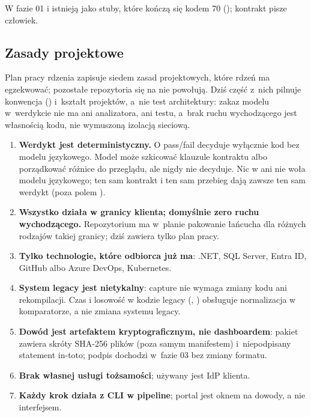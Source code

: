 W fazie 01  i  istnieją jako stuby, które kończą
się kodem 70 (); kontrakt pisze człowiek.


\subsection{Zasady projektowe}\label{sec:architektura-zasady}

Plan pracy rdzenia zapisuje siedem zasad projektowych, które rdzeń ma egzekwować;
pozostałe repozytoria się na nie powołują. Dziś część z~nich pilnuje konwencja
() i~kształt projektów, a~nie test architektury:
zakaz modelu w~werdykcie nie ma ani analizatora, ani testu, a~brak ruchu wychodzącego
jest własnością kodu, nie wymuszoną izolacją sieciową.

\begin{enumerate}
  \item \textbf{Werdykt jest deterministyczny.} O pass/fail decyduje wyłącznie kod bez
        modelu językowego. Model może szkicować klauzule kontraktu albo porządkować
        różnice do przeglądu, ale nigdy nie decyduje. Nic w 
        ani  nie woła modelu językowego; ten sam kontrakt i
        ten sam przebieg dają zawsze ten sam werdykt (poza polem ).
  \item \textbf{Wszystko działa w granicy klienta; domyślnie zero ruchu wychodzącego.}
        Repozytorium  ma w~planie pakowanie łańcucha dla
        różnych rodzajów takiej granicy; dziś zawiera tylko plan pracy.
  \item \textbf{Tylko technologie, które odbiorca już ma}: .NET, SQL Server, Entra ID,
        GitHub albo Azure DevOps, Kubernetes.
  \item \textbf{System legacy jest nietykalny}: capture nie wymaga zmiany kodu ani
        rekompilacji. Czas i losowość w kodzie legacy (,
        ) obsługuje normalizacja w komparatorze, a nie zmiana
        systemu legacy.
  \item \textbf{Dowód jest artefaktem kryptograficznym, nie dashboardem}: pakiet zawiera
        skróty SHA-256 plików (poza samym manifestem) i~niepodpisany statement in-toto;
        podpis dochodzi w~fazie 03 bez zmiany formatu.
  \item \textbf{Brak własnej usługi tożsamości}; używany jest IdP klienta.
  \item \textbf{Każdy krok działa z CLI w pipeline}; portal jest oknem na dowody, a nie
        interfejsem.
\end{enumerate}

